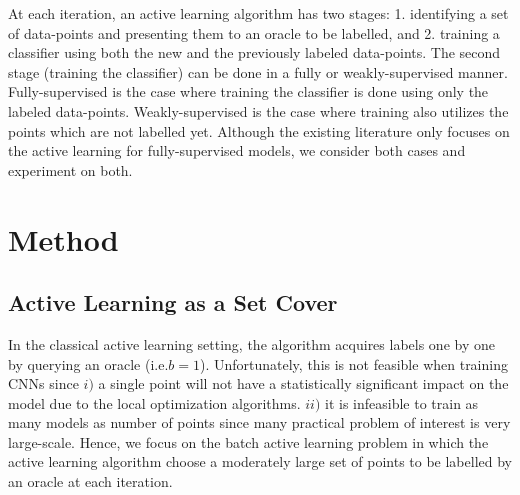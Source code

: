 \documentclass{article} \usepackage{iclr2018_conference,times}
\makeatletter
\newcommand*{\ie}{i.e.\@\xspace}
\makeatother
\begin{document}
At each iteration, an active learning algorithm has two stages: 1. identifying a set of data-points and presenting them
to an oracle to be labelled, and 2. training a classifier using both the new and the previously labeled data-points. The
second stage (training the classifier) can be done in a fully or weakly-supervised manner. Fully-supervised is the case
where training the classifier is done using only the labeled data-points. Weakly-supervised is the case where training
also utilizes the points which are not labelled yet. Although the existing literature only focuses on the active
learning for fully-supervised models, we consider both cases and experiment on both. 

\section{Method} 
\subsection{Active Learning as a Set Cover} 
In the classical active learning setting, the algorithm acquires
labels one by one by querying an oracle (\ie $b=1$). Unfortunately, this is not feasible when training CNNs since $i)$
a single point will not have a statistically significant impact on the model due to the local optimization algorithms.
$ii)$ it is infeasible to train as many models as number of points since many practical problem of interest is very
large-scale. Hence, we focus on the batch active learning problem in
which the active learning algorithm choose a moderately large set of points to be labelled by an oracle at each
iteration.
\end{document}
